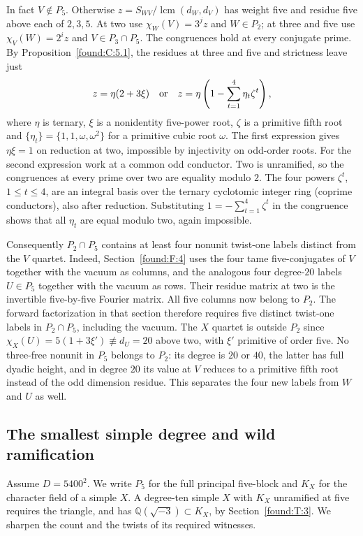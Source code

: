 \documentclass[11pt,a4paper]{article}
\numberwithin{equation}{section}
\theoremstyle{remark}
\newcommand{\QQ}{\mathbb Q}
\begin{document}
In fact $V\notin P_5$. Otherwise $z=S_{WV}/\operatorname{lcm}(d_W,d_V)$
has weight five and residue five above each of $2,3,5$. At two use
$\chi_W(V)=3^jz$ and $W\in P_2$; at three and five use
$\chi_V(W)=2^iz$ and $V\in P_3\cap P_5$. The congruences hold
at every conjugate prime. By Proposition~\ref{found:C:5.1}, the residues
at three and five and strictness leave just
\[
 z=\eta(2+3\xi)
 \quad\hbox{or}\quad
 z=\eta\left(1-\sum_{t=1}^{4}\eta_t\zeta^t\right),
\]
where $\eta$ is ternary, $\xi$ is a nonidentity five-power root,
$\zeta$ is a primitive fifth root and
$\{\eta_t\}=\{1,1,\omega,\omega^2\}$ for a primitive cubic root
$\omega$. The first expression gives $\eta\xi=1$ on reduction at
two, impossible by injectivity on odd-order roots. For the second
expression work at a common odd conductor. Two is unramified, so
the congruences at every prime over two are equality modulo $2$.
The four powers $\zeta^t$, $1\le t\le4$, are an integral basis over
the ternary cyclotomic integer ring (coprime conductors), also after
reduction. Substituting $1=-\sum_{t=1}^4\zeta^t$ in the congruence
shows that all $\eta_t$ are equal modulo two, again impossible.

Consequently $P_2\cap P_5$ contains at least four nonunit twist-one
labels distinct from the $V$ quartet. Indeed, Section~\ref{found:F:4} uses the four tame
five-conjugates of $V$ together with the vacuum as columns, and
the analogous four degree-$20$ labels $U\in P_5$ together with the
vacuum as rows. Their residue matrix at two is the invertible
five-by-five Fourier matrix. All five columns now belong to $P_2$.
The forward factorization in that section therefore requires five
distinct twist-one labels in $P_2\cap P_5$, including the vacuum.
The $X$ quartet is outside $P_2$ since
$\chi_X(U)=5(1+3\xi')\not\equiv d_U=20$ above two, with $\xi'$
primitive of order five. No three-free nonunit in $P_5$ belongs to
$P_2$: its degree is $20$ or $40$, the latter has full dyadic
height, and in degree $20$ its value at $V$ reduces to a primitive
fifth root instead of the odd dimension residue. This separates
the four new labels from $W$ and $U$ as well.

\subsection{The smallest simple degree and wild ramification}
Assume $D=5400^2$. We write $P_5$ for the full principal five-block and $K_X$ for the character field of a simple $X$. A degree-ten simple $X$ with $K_X$ unramified at five requires the triangle, and has $\QQ(\sqrt{-3})\subset K_X$, by Section~\ref{found:T:3}. We sharpen the count and the twists of its required witnesses.
\end{document}
